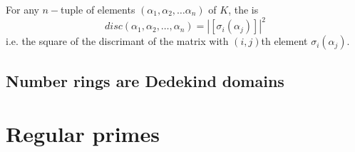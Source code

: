 \begin{definition}
For any $n-$tuple of elements $(\alpha_1,\alpha_2,\dots \alpha_n)$ of $K$, the  is 
$$disc(\alpha_1,\alpha_2,\dots,\alpha_n)=|[\sigma_i(\alpha_j)]|^2$$
i.e. the square of the discrimant of the matrix with $(i,j)$th element $\sigma_i(\alpha_j)$.
\end{definition}


\subsection{Number rings are Dedekind domains}



\section{Regular primes}


